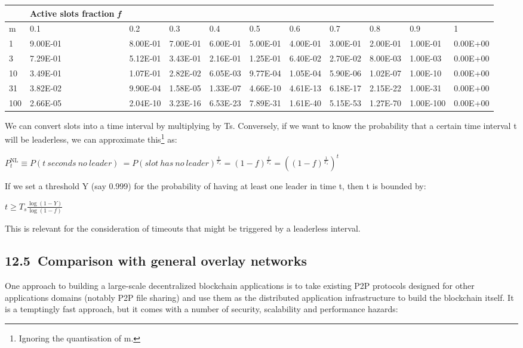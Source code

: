 \documentclass[]{article}
\begin{document}
\begin{longtable}[]{@{}lllllllllll@{}}
\toprule
& \textbf{Active slots fraction \emph{f}} & & & & & & & &
&\tabularnewline
\midrule
\endhead
m & 0.1 & 0.2 & 0.3 & 0.4 & 0.5 & 0.6 & 0.7 & 0.8 & 0.9 &
1\tabularnewline
1 & 9.00E-01 & 8.00E-01 & 7.00E-01 & 6.00E-01 & 5.00E-01 & 4.00E-01 &
3.00E-01 & 2.00E-01 & 1.00E-01 & 0.00E+00\tabularnewline
3 & 7.29E-01 & 5.12E-01 & 3.43E-01 & 2.16E-01 & 1.25E-01 & 6.40E-02 &
2.70E-02 & 8.00E-03 & 1.00E-03 & 0.00E+00\tabularnewline
10 & 3.49E-01 & 1.07E-01 & 2.82E-02 & 6.05E-03 & 9.77E-04 & 1.05E-04 &
5.90E-06 & 1.02E-07 & 1.00E-10 & 0.00E+00\tabularnewline
31 & 3.82E-02 & 9.90E-04 & 1.58E-05 & 1.33E-07 & 4.66E-10 & 4.61E-13 &
6.18E-17 & 2.15E-22 & 1.00E-31 & 0.00E+00\tabularnewline
100 & 2.66E-05 & 2.04E-10 & 3.23E-16 & 6.53E-23 & 7.89E-31 & 1.61E-40 &
5.15E-53 & 1.27E-70 & 1.00E-100 & 0.00E+00\tabularnewline
\bottomrule
\end{longtable}

We can convert slots into a time interval by multiplying by Ts.
Conversely, if we want to know the probability that a certain time
interval t will be leaderless, we can approximate this\footnote{Ignoring
  the quantisation of m.} as:

\(P_{t}^{\text{NL}} \equiv P(t\ seconds\ no\ leader)\  = {P(slot\ has\ no\ leader)}^{\frac{t}{T_{s}}} = \left( 1 - f \right)^{\frac{t}{T_{s}}} = \left( \left( 1 - f \right)^{\frac{1}{T_{s}}} \right)^{t}\)

If we set a threshold Y (say 0.999) for the probability of having at
least one leader in time t, then t is bounded by:

\(t \geq T_{s}\frac{\log\left( 1 - Y \right)}{\log\left( 1 - f \right)}\)

This is relevant for the consideration of timeouts that might be
triggered by a leaderless interval.

\hypertarget{comparison-with-general-overlay-networks}{%
\subsection{​12.5​~Comparison with general overlay networks
}\label{comparison-with-general-overlay-networks}}

One approach to building a large-scale decentralized blockchain
applications is to take existing P2P protocols designed for other
applications domains (notably P2P file sharing) and use them as the
distributed application infrastructure to build the blockchain itself.
It is a temptingly fast approach, but it comes with a number of
security, scalability and performance hazards:
\end{document}
